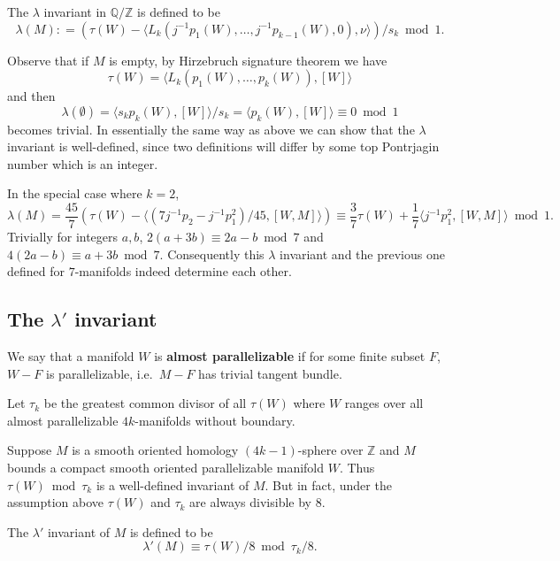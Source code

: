 \documentclass[twoside]{article}
\begin{document}
\begin{define}
	The $\lambda$ invariant in $\mathbb{Q}/\mathbb{Z}$ is defined to be 
	\[
	\lambda(M) \colon  = (\tau(W)-\langle L_k(j^{-1}p_1(W), \dots  ,j^{-1}p_{k-1}(W),0),\nu\rangle)/s_k  \bmod  1. 
	\]
\end{define}

Observe that if $M$ is empty, by Hirzebruch signature theorem we have 
\[
\tau(W) = \langle L_k(p_1(W), \dots  ,p_k(W)),[W]\rangle
\]
and then 
\[
\lambda(\emptyset) = \langle s_kp_k(W),[W]\rangle/s_k = \langle p_k(W),[W]\rangle \equiv  0  \bmod  1
\]
becomes trivial. In essentially the same way as above we can show that the $\lambda$ invariant is well-defined, since two definitions will differ by some top Pontrjagin number which is an integer. 

In the special case where $k = 2$, 
\[
\lambda(M) = \frac{45}{7}({\tau(W)-\langle(7j^{-1}p_2-j^{-1}p_1^2)/45,[W,M]\rangle}) \equiv  \frac{3}{7}\tau(W) + \frac{1}{7}\langle j^{-1}p_1^2,[W,M]\rangle  \bmod  1.  
\]
Trivially for integers $a,b$, $2(a + 3b) \equiv 2a-b  \bmod  7$ and $4(2a-b) \equiv  a + 3b \bmod  7$. Consequently this $\lambda$ invariant and the previous one defined for $7$-manifolds indeed determine each other.  


\subsection{The \texorpdfstring{$\lambda'$}{lambda'} invariant}

We say that a manifold $W$ is \textbf{almost parallelizable} if for some finite subset $F$, $W-F$ is parallelizable, i.e.\ $M-F$ has trivial tangent bundle. 

Let $\tau_k$ be the greatest common divisor of all $\tau(W)$ where $W$ ranges over all almost parallelizable $4k$-manifolds without boundary. 

Suppose $M$ is a smooth oriented homology $(4k-1)$-sphere over $\mathbb{Z}$ and $M$ bounds a compact smooth oriented parallelizable manifold $W$. Thus $\tau(W)  \bmod  \tau_k$ is a well-defined invariant of $M$. But in fact, under the assumption above $\tau(W)$ and $\tau_k$ are always divisible by $8$. 

\begin{define}
	The $\lambda'$ invariant of $M$ is defined to be 
	\[
	\lambda'(M) \equiv  \tau(W)/8  \bmod  \tau_k/8. 
	\]
\end{define}
\end{document}
